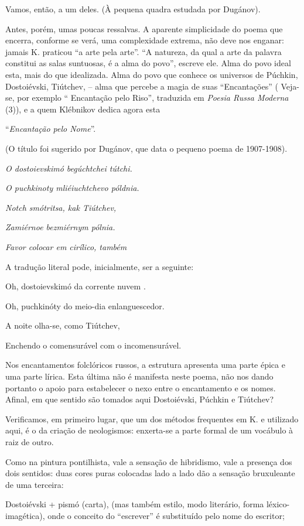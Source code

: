 Vamos, então, a um deles. (À pequena quadra estudada por Dugánov).

Antes, porém, umas poucas ressalvas. A aparente simplicidade do poema
que encerra, conforme se verá, uma complexidade extrema, não deve nos
enganar: jamais K. praticou ``a arte pela arte''. ``A natureza, da qual
a arte da palavra constitui as salas suntuosas, é a alma do povo'',
escreve ele. Alma do povo ideal esta, mais do que idealizada. Alma do
povo que conhece os universos de Púchkin, Dostoiévski, Tiútchev, -- alma
que percebe a magia de suas ``Encantações'' ( Veja-se, por exemplo ``
Encantação pelo Riso'', traduzida em \emph{Poesia Russa Moderna} (3)), e
a quem Klébnikov dedica agora esta

``\emph{Encantação pelo Nome}''.

(O título foi sugerido por Dugánov, que data o pequeno poema de
1907-1908).

\emph{O dostoievskimó begúchtchei tútchi.}

\emph{O puchkinoty mliéiuchtchevo póldnia.}

\emph{Notch smótritsa, kak Tiútchev,}

\emph{Zamiérnoe bezmiérnym pólnia.}

\emph{Favor colocar em cirílico, também}

A tradução literal pode, inicialmente, ser a seguinte:

Oh, dostoievskimó da corrente nuvem .

Oh, puchkinóty do meio-dia enlanguescedor.

A noite olha-se, como Tiútchev,

Enchendo o comensurável com o incomensurável.

Nos encantamentos folclóricos russos, a estrutura apresenta uma parte
épica e uma parte lírica. Esta última não é manifesta neste poema, não
nos dando portanto o apoio para estabelecer o nexo entre o encantamento
e os nomes. Afinal, em que sentido são tomados aqui Dostoiévski, Púchkin
e Tiútchev?

Verificamos, em primeiro lugar, que um dos métodos frequentes em K. e
utilizado aqui, é o da criação de neologismos: enxerta-se a parte formal
de um vocábulo à raiz de outro.

Como na pintura pontilhista, vale a sensação de hibridismo, vale a
presença dos dois sentidos: duas cores puras colocadas lado a lado dão a
sensação bruxuleante de uma terceira:

Dostoiévski + pismó (carta), (mas também estilo, modo literário, forma
léxico-imagética), onde o conceito do ``escrever'' é substituído pelo
nome do escritor;

